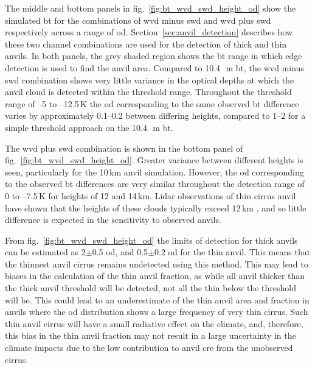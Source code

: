 The middle and bottom panels in fig.~\ref{fig:bt_wvd_swd_height_od} show the simulated \acrshort{bt} for the combinations of \acrshort{wvd} minus \acrshort{swd} and \acrshort{wvd} plus \acrshort{swd} respectively across a range of \acrshort{od}.
Section~\ref{sec:anvil_detection} describes how these two channel combinations are used for the detection of thick and thin anvils.
In both panels, the grey shaded region shows the \acrshort{bt} range in which edge detection is used to find the anvil area.
Compared to 10.4\,\unit{\mu m} \acrshort{bt}, the \acrshort{wvd} minus \acrshort{swd} combination shows very little variance in the optical depths at which the anvil cloud is detected within the threshold range.
Throughout the threshold range of --5 to --12.5\,\unit{K} the \acrshort{od} corresponding to the same observed \acrshort{bt} difference varies by approximately 0.1--0.2 between differing heights, compared to 1--2 for a simple threshold approach on the 10.4\,\unit{\mu m} \acrshort{bt}.

The \acrshort{wvd} plus \acrshort{swd} combination is shown in the bottom panel of fig.~\ref{fig:bt_wvd_swd_height_od}.
Greater variance between different heights is seen, particularly for the 10\,\unit{km} anvil simulation.
However, the \acrshort{od} corresponding to the observed \acrshort{bt} differences are very similar throughout the detection range of 0 to --7.5\,\unit{K} for heights of 12 and 14\,\unit{km}.
Lidar observations of thin cirrus anvil have shown that the heights of these clouds typically exceed 12\,\unit{km} \citep{wall_observational_2020, horner_evolution_2023}, and so little difference is expected in the sensitivity to observed anvils.

From fig.~\ref{fig:bt_wvd_swd_height_od} the limits of detection for thick anvils can be estimated as 2$\pm$0.5 \acrshort{od}, and 0.5$\pm$0.2 \acrshort{od} for the thin anvil.
This means that the thinnest anvil cirrus remains undetected \citep{berry_cloud_2014} using this method.
This may lead to biases in the calculation of the thin anvil fraction, as while all anvil thicker than the thick anvil threshold will be detected, not all the thin below the threshold will be.
This could lead to an underestimate of the thin anvil area and fraction in anvils where the \acrshort{od} distribution shows a large frequency of very thin cirrus.
Such thin anvil cirrus will have a small radiative effect on the climate, and, therefore, this bias in the thin anvil fraction may not result in a large uncertainty in the climate impacts due to the low contribution to anvil \acrshort{cre} from the unobserved cirrus.

